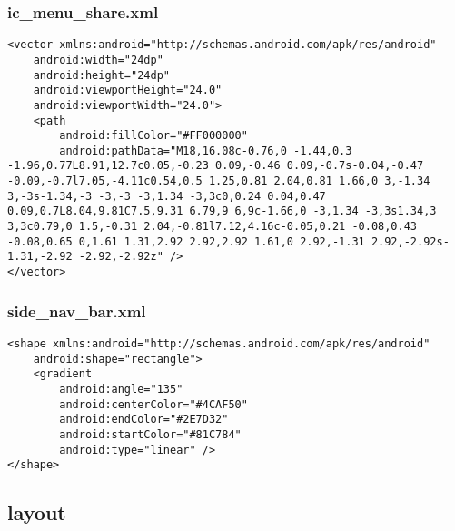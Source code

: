 \subsubsection*{ic\_menu\_share.xml}
\begin{lstlisting}
<vector xmlns:android="http://schemas.android.com/apk/res/android"
    android:width="24dp"
    android:height="24dp"
    android:viewportHeight="24.0"
    android:viewportWidth="24.0">
    <path
        android:fillColor="#FF000000"
        android:pathData="M18,16.08c-0.76,0 -1.44,0.3 -1.96,0.77L8.91,12.7c0.05,-0.23 0.09,-0.46 0.09,-0.7s-0.04,-0.47 -0.09,-0.7l7.05,-4.11c0.54,0.5 1.25,0.81 2.04,0.81 1.66,0 3,-1.34 3,-3s-1.34,-3 -3,-3 -3,1.34 -3,3c0,0.24 0.04,0.47 0.09,0.7L8.04,9.81C7.5,9.31 6.79,9 6,9c-1.66,0 -3,1.34 -3,3s1.34,3 3,3c0.79,0 1.5,-0.31 2.04,-0.81l7.12,4.16c-0.05,0.21 -0.08,0.43 -0.08,0.65 0,1.61 1.31,2.92 2.92,2.92 1.61,0 2.92,-1.31 2.92,-2.92s-1.31,-2.92 -2.92,-2.92z" />
</vector>
\end{lstlisting}

\subsubsection*{side\_nav\_bar.xml}
\begin{lstlisting}
<shape xmlns:android="http://schemas.android.com/apk/res/android"
    android:shape="rectangle">
    <gradient
        android:angle="135"
        android:centerColor="#4CAF50"
        android:endColor="#2E7D32"
        android:startColor="#81C784"
        android:type="linear" />
</shape>
\end{lstlisting}

\subsection*{layout}
